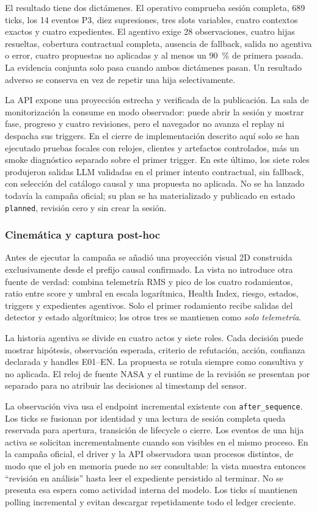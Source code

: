 El resultado tiene dos dictámenes. El operativo comprueba sesión completa, 689
ticks, los 14 eventos P3, diez supresiones, tres slots variables, cuatro
contextos exactos y cuatro expedientes. El agentivo exige 28
observaciones, cuatro hijas resueltas, cobertura contractual completa, ausencia
de fallback, salida no agentiva o error, cuatro propuestas no aplicadas y al
menos un 90~\% de primera pasada. La evidencia conjunta solo pasa cuando ambos
dictámenes pasan. Un resultado adverso se conserva en vez de repetir una hija
selectivamente.

La API expone una proyección estrecha y verificada de la publicación. La sala
de monitorización la consume en modo observador: puede abrir la sesión y mostrar
fase, progreso y cuatro revisiones, pero el navegador no avanza el replay ni
despacha sus triggers. En el cierre de implementación descrito aquí solo se han
ejecutado pruebas focales con relojes, clientes y artefactos controlados, más un
smoke diagnóstico separado sobre el primer trigger. En este último, los siete
roles produjeron salidas LLM validadas en el primer intento contractual, sin
fallback, con selección del catálogo causal y una propuesta no aplicada. No se
ha lanzado todavía la campaña oficial; su plan se ha materializado y publicado
en estado \texttt{planned}, revisión cero y sin crear la sesión.

\subsubsection{Cinemática y captura post-hoc}

Antes de ejecutar la campaña se añadió una proyección visual 2D construida
exclusivamente desde el prefijo causal confirmado. La vista no introduce otra
fuente de verdad: combina telemetría RMS y pico de los cuatro rodamientos, ratio
entre score y umbral en escala logarítmica, Health Index, riesgo, estados,
triggers y expedientes agentivos. Solo el primer rodamiento recibe salidas del
detector y estado algorítmico; los otros tres se mantienen como \emph{solo
telemetría}.

La historia agentiva se divide en cuatro actos y siete roles. Cada decisión
puede mostrar hipótesis, observación esperada, criterio de refutación, acción,
confianza declarada y handles E01--EN. La propuesta se rotula siempre como
consultiva y no aplicada. El reloj de fuente NASA y el runtime de la revisión se
presentan por separado para no atribuir las decisiones al timestamp del sensor.

La observación viva usa el endpoint incremental existente con
\texttt{after\_sequence}. Los ticks se fusionan por identidad y una lectura de
sesión completa queda reservada para apertura, transición de lifecycle o cierre.
Los eventos de una hija activa se solicitan incrementalmente cuando son visibles
en el mismo proceso. En la campaña oficial, el driver y la API observadora usan
procesos distintos, de modo que el job en memoria puede no ser consultable: la
vista muestra entonces ``revisión en análisis'' hasta leer el expediente
persistido al terminar. No se presenta esa espera como actividad interna del
modelo. Los ticks sí mantienen polling incremental y evitan descargar
repetidamente todo el ledger creciente.

